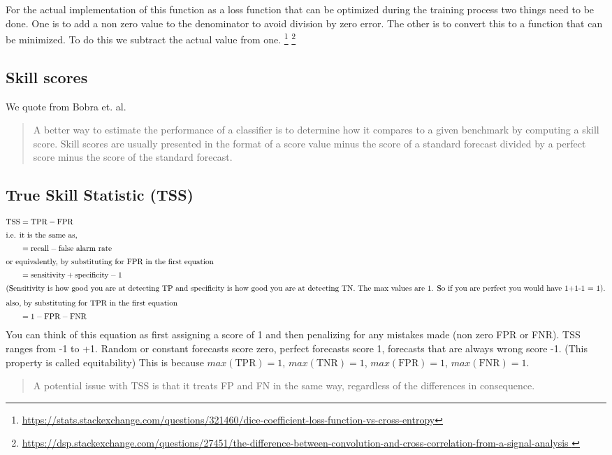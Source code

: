 \documentclass{../template/texnote}
\begin{document}
For the actual implementation of this function as a loss function that can be optimized during the training process two things need to be done. One is to add a non zero value to the denominator to avoid division by zero error. The other is to convert this to a function that can be minimized. To do this we subtract the actual value from one.
\footnote{\url{https://stats.stackexchange.com/questions/321460/dice-coefficient-loss-function-vs-cross-entropy}}
\footnote{\url{https://dsp.stackexchange.com/questions/27451/the-difference-between-convolution-and-cross-correlation-from-a-signal-analysis }}

\subsection{Skill scores}
We quote from Bobra et. al.
\begin{quote}
A better way to estimate the performance of a classifier is to determine how it compares to a given benchmark by computing a skill score. Skill scores are usually presented in the format of a score value minus the score of a standard forecast divided by a perfect score minus the score of the standard forecast.
\end{quote}
\subsection{True Skill Statistic (TSS)}
\begin{align}
    \textrm{TSS}   &= \textrm{TPR} - \textrm{FPR} \\
\intertext{i.e. it is the same as,} 
		   &= \textrm{recall} - \textrm{false alarm rate} \\
		   \intertext{or equivalently, by substituting for FPR in the first equation}
		   &= \textrm{sensitivity} + \textrm{specificity} - 1  \\
		   \intertext{(Sensitivity is how good you are at detecting TP and specificity is how good you are at detecting TN. The max values are 1. So if you are perfect you would have 1+1-1 = 1).}
		   \intertext{also, by substituting for TPR in the first equation} 
		   &= 1 - \textrm{FPR} - \textrm{FNR} 
\end{align}
You can think of this equation as first assigning a score of 1 and then penalizing for any mistakes made (non zero FPR or FNR).
TSS ranges from -1 to +1. 
Random or constant forecasts score zero, perfect forecasts score 1, forecasts that are always wrong score -1. (This property is called equitability)
This is because \( max(\textrm{TPR}) = 1 \), \( max(\textrm{TNR}) = 1 \), \( max(\textrm{FPR}) = 1 \), \( max(\textrm{FNR}) = 1 \). 
\begin{quote}
A potential issue with TSS is that it treats FP and FN in the same way, regardless of the differences in consequence.
\end{quote}

    \printbibliography
\end{document}
